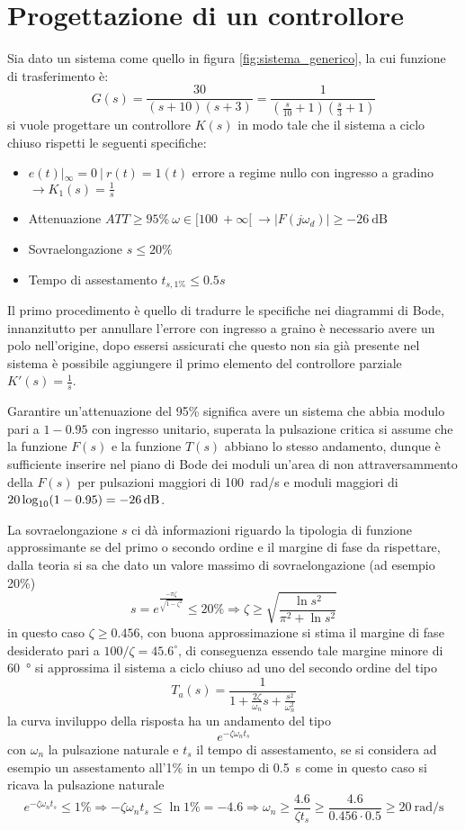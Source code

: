 \section{Progettazione di un controllore}

Sia dato un sistema come quello in figura \ref{fig:sistema_generico}, la
cui funzione di trasferimento è:
$$
    G(s) = \frac{30}{(s+10)(s+3)} = \frac{1}{\left(\frac{s}{10}+1\right)\left(\frac{s}{3}+1\right)}
$$
si vuole
progettare un controllore $K(s)$ in modo tale che il sistema a ciclo chiuso
rispetti le seguenti specifiche:
\begin{itemize}
    \item $e(t)|_{\infty} = 0 \ |\ r(t) = 1(t) $ errore a regime nullo con ingresso a gradino $\rightarrow K_1(s) = \frac{1}{s}$
    \item Attenuazione $ATT \geq 95\%\ \omega \in [100\ +\infty[\ \rightarrow |F(j\omega_d)| \geq \SI{-26}{\deci\bel}$
    \item Sovraelongazione $s\leq 20\%$
    \item Tempo di assestamento $t_{s,1\%} \leq 0.5 s$
\end{itemize}

Il primo procedimento è quello di tradurre le specifiche nei diagrammi di Bode,
innanzitutto per annullare l'errore con ingresso a graino è necessario avere
un polo nell'origine, dopo essersi assicurati che questo non sia già presente nel sistema è possibile aggiungere il primo elemento del controllore parziale $K'(s) = \frac{1}{s}$.

Garantire un'attenuazione del 95\% significa avere un sistema che abbia modulo pari a $1-0.95$ con ingresso unitario, superata la pulsazione critica si assume che la funzione $F(s)$ e la funzione $T(s)$ abbiano lo stesso andamento, dunque
è sufficiente inserire nel piano di Bode dei moduli un'area di non attraversammento della $F(s)$ per pulsazioni maggiori di \SI{100}{\radian/\second} e moduli maggiori di $20\log_{10}(1-0.95) = \SI{-26}{\deci{\bel}}$.

La sovraelongazione $s$ ci dà informazioni riguardo la tipologia di funzione approssimante se del primo o secondo ordine e il margine di fase da rispettare,
dalla teoria si sa che dato un valore massimo di sovraelongazione (ad esempio 20\%)
$$
    s = e^{\frac{-\pi \zeta}{\sqrt{1-\zeta^2}}} \leq 20\% \Rightarrow \zeta \geq \sqrt{\frac{\ln s^2}{\pi^2 + \ln s^2}}
$$
in questo caso $\zeta \geq 0.456$, con buona approssimazione si stima il margine
di fase desiderato pari a $100/\zeta = 45.6^\circ$, di conseguenza essendo tale margine minore di \SI{60}{\degree} si approssima il sistema a ciclo chiuso ad uno del secondo ordine del tipo
$$
    T_a(s) =  \frac{1}{1+\frac{2\zeta}{\omega_n}s + \frac{s^2}{\omega_n^2}}
$$
la curva inviluppo della risposta ha un andamento del tipo
$$
    e^{-\zeta \omega_n t_s}
$$
con $\omega_n$ la pulsazione naturale e $t_s$ il tempo di assestamento, se si considera ad esempio un assestamento all'1\% in un tempo di \SI{0.5}{\second} come in questo caso si ricava la pulsazione naturale
$$
    e^{-\zeta \omega_n t_s} \leq 1\% \Rightarrow -\zeta\omega_n t_s \leq \ln{1\%} = -4.6 \Rightarrow \omega_n \geq \frac{4.6}{\zeta t_s} \geq \frac{4.6}{0.456\cdot 0.5} \geq \SI{20}{\radian/\second}
$$

